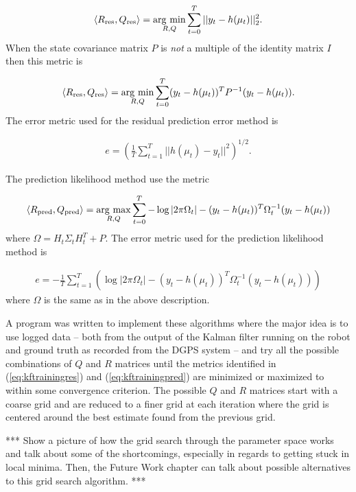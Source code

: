 \begin{align*}
\left<R_{\text{res}},Q_{\text{res}}\right> = \mathop{\arg\,\min}\limits_{R,Q}\sum_{t=0}^T ||y_t-h(\mu_t)||_2^2.
\end{align*}
When the state covariance matrix $P$ is \textit{not} a multiple of the identity matrix $I$ then this metric is

\begin{align*}
\left<R_{\text{res}},Q_{\text{res}}\right> = \mathop{\arg\,\min}\limits_{R,Q}\sum_{t=0}^T (y_t-h(\mu_t))^TP^{-1}(y_t-h(\mu_t)).
\end{align*}
The error metric used for the residual prediction error method is

\begin{align}
\label{eq:kftrainingres}
e = \left(\frac{1}{T}\sum_{t=1}^T ||h(\mu_t)-y_t||^2\right)^{1/2}.
\end{align}

The prediction likelihood method use the metric

\begin{align*}
\left<R_{\text{pred}},Q_{\text{pred}}\right> = \mathop{\arg\,\max}\limits_{R,Q}\sum_{t=0}^T -\log|2\pi\Omega_t| - (y_t-h(\mu_t))^T\Omega_t^{-1}(y_t-h(\mu_t))
\end{align*}
where $\Omega = H_t\Sigma_tH_t^T+P$. The error metric used for the prediction likelihood method is

\begin{align}
\label{eq:kftrainingpred}
e = -\frac{1}{T}\sum_{t=1}^T \left(\log|2\pi\Omega_t| - (y_t-h(\mu_t))^T\Omega_t^{-1}(y_t-h(\mu_t))\right)
\end{align}
where $\Omega$ is the same as in the above description.

A program was written to implement these algorithms where the major idea is to use logged data -- both from the output of the Kalman filter running on the robot and ground truth as recorded from the DGPS system -- and try all the possible combinations of $Q$ and $R$ matrices until the metrics identified in (\ref{eq:kftrainingres}) and (\ref{eq:kftrainingpred}) are minimized or maximized to within some convergence criterion. The possible $Q$ and $R$ matrices start with a coarse grid and are reduced to a finer grid at each iteration where the grid is centered around the best estimate found from the previous grid.

*** Show a picture of how the grid search through the parameter space works and talk about some of the shortcomings, especially in regards to getting stuck in local minima. Then, the Future Work chapter can talk about possible alternatives to this grid search algorithm. ***


